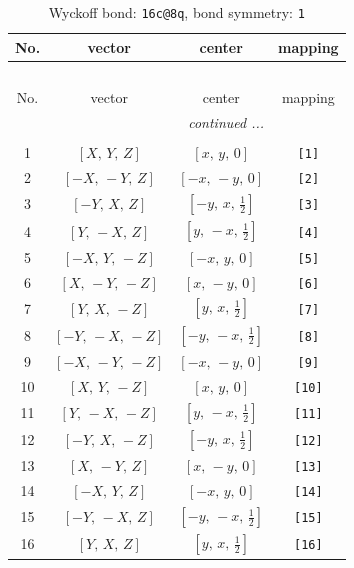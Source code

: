\documentclass[fleqn,8pt]{jsarticle}
\begin{document}
\begin{longtable}{cccc}
\caption{Wyckoff bond: {\tt 16c@8q}, bond symmetry: {\tt 1}}
 \\
 \hline \hline
No. & vector & center & mapping \\ \hline \endfirsthead

\multicolumn{3}{l}{\tablename\ \thetable{}} \\
 \hline \hline
No. & vector & center & mapping \\ \hline \endhead

 \hline \hline
\multicolumn{3}{r}{\footnotesize\it continued ...} \\ \endfoot

 \hline \hline
\multicolumn{3}{r}{} \\ \endlastfoot

1 & $\left[ X,\, Y,\, Z \right]$ & $\left[ x,\, y,\, 0 \right]$ & {\tt [1]} \\ \hline
2 & $\left[ - X,\, - Y,\, Z \right]$ & $\left[ - x,\, - y,\, 0 \right]$ & {\tt [2]} \\ \hline
3 & $\left[ - Y,\, X,\, Z \right]$ & $\left[ - y,\, x,\, \frac{1}{2} \right]$ & {\tt [3]} \\ \hline
4 & $\left[ Y,\, - X,\, Z \right]$ & $\left[ y,\, - x,\, \frac{1}{2} \right]$ & {\tt [4]} \\ \hline
5 & $\left[ - X,\, Y,\, - Z \right]$ & $\left[ - x,\, y,\, 0 \right]$ & {\tt [5]} \\ \hline
6 & $\left[ X,\, - Y,\, - Z \right]$ & $\left[ x,\, - y,\, 0 \right]$ & {\tt [6]} \\ \hline
7 & $\left[ Y,\, X,\, - Z \right]$ & $\left[ y,\, x,\, \frac{1}{2} \right]$ & {\tt [7]} \\ \hline
8 & $\left[ - Y,\, - X,\, - Z \right]$ & $\left[ - y,\, - x,\, \frac{1}{2} \right]$ & {\tt [8]} \\ \hline
9 & $\left[ - X,\, - Y,\, - Z \right]$ & $\left[ - x,\, - y,\, 0 \right]$ & {\tt [9]} \\ \hline
10 & $\left[ X,\, Y,\, - Z \right]$ & $\left[ x,\, y,\, 0 \right]$ & {\tt [10]} \\ \hline
11 & $\left[ Y,\, - X,\, - Z \right]$ & $\left[ y,\, - x,\, \frac{1}{2} \right]$ & {\tt [11]} \\ \hline
12 & $\left[ - Y,\, X,\, - Z \right]$ & $\left[ - y,\, x,\, \frac{1}{2} \right]$ & {\tt [12]} \\ \hline
13 & $\left[ X,\, - Y,\, Z \right]$ & $\left[ x,\, - y,\, 0 \right]$ & {\tt [13]} \\ \hline
14 & $\left[ - X,\, Y,\, Z \right]$ & $\left[ - x,\, y,\, 0 \right]$ & {\tt [14]} \\ \hline
15 & $\left[ - Y,\, - X,\, Z \right]$ & $\left[ - y,\, - x,\, \frac{1}{2} \right]$ & {\tt [15]} \\ \hline
16 & $\left[ Y,\, X,\, Z \right]$ & $\left[ y,\, x,\, \frac{1}{2} \right]$ & {\tt [16]} \\
\end{longtable}
\end{document}
